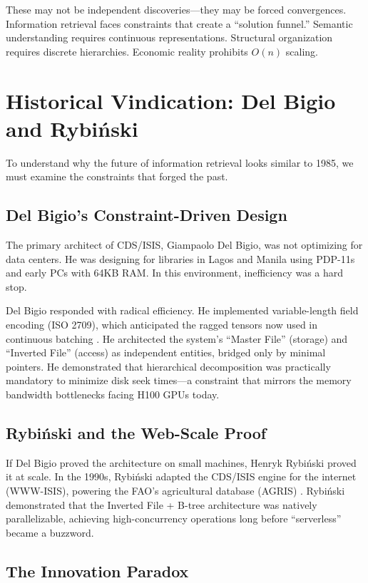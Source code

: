 \documentclass[manuscript,screen,nonacm]{acmart}
\begin{document}
These may not be independent discoveries---they may be forced convergences. Information retrieval faces constraints that create a ``solution funnel.'' Semantic understanding requires continuous representations. Structural organization requires discrete hierarchies. Economic reality prohibits $O(n)$ scaling.

\section{Historical Vindication: Del Bigio and Rybiński}

To understand why the future of information retrieval looks similar to 1985, we must examine the constraints that forged the past.

\subsection{Del Bigio's Constraint-Driven Design}

The primary architect of CDS/ISIS, Giampaolo Del Bigio, was not optimizing for data centers. He was designing for libraries in Lagos and Manila using PDP-11s and early PCs with 64KB RAM. In this environment, inefficiency was a hard stop.

Del Bigio responded with radical efficiency. He implemented variable-length field encoding (ISO 2709), which anticipated the ragged tensors now used in continuous batching \cite{iso2709}. He architected the system's ``Master File'' (storage) and ``Inverted File'' (access) as independent entities, bridged only by minimal pointers. He demonstrated that hierarchical decomposition was practically mandatory to minimize disk seek times---a constraint that mirrors the memory bandwidth bottlenecks facing H100 GPUs today.

\subsection{Rybiński and the Web-Scale Proof}

If Del Bigio proved the architecture on small machines, Henryk Rybiński proved it at scale. In the 1990s, Rybiński adapted the CDS/ISIS engine for the internet (WWW-ISIS), powering the FAO's agricultural database (AGRIS) \cite{rybinski1999}. Rybiński demonstrated that the Inverted File + B-tree architecture was natively parallelizable, achieving high-concurrency operations long before ``serverless'' became a buzzword.

\subsection{The Innovation Paradox}
\end{document}
